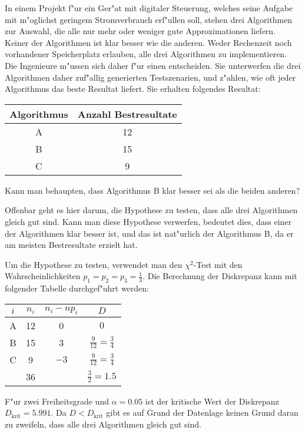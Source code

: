 In einem Projekt f"ur ein Ger"at mit digitaler Steuerung, welches
seine Aufgabe mit m"oglichst geringem Stromverbrauch erf"ullen soll, stehen
drei Algorithmen zur Auswahl, die alle nur mehr oder weniger gute
Approximationen liefern. Keiner der Algorithmen ist klar besser wie
die anderen. Weder Rechenzeit noch vorhandener Speicherplatz
erlauben, alle drei Algorithmen zu implementieren. Die Ingenieure
m"ussen sich daher f"ur einen entscheiden. Sie unterwerfen die drei
Algorithmen daher zuf"allig generierten Testszenarien, und z"ahlen,
wie oft jeder Algorithmus das beste Resultat liefert. Sie erhalten
folgendes Resultat:
\begin{center}
\begin{tabular}{c|c}
Algorithmus&Anzahl Bestresultate\\
\hline
A&12\\
B&15\\
C&9\\
\end{tabular}
\end{center}
Kann man behaupten, dass Algorithmus B klar besser sei als die beiden
anderen?

\begin{loesung}
Offenbar geht es hier darum, die Hypothese zu testen, dass alle
drei Algorithmen gleich gut sind. Kann man diese Hypothese
verwerfen, bedeutet dies, dass einer der Algorithmen klar besser ist,
und das ist nat"urlich der Algorithmus B, da er am meisten Bestresultate
erzielt hat.

Um die Hypothese zu testen, verwendet man den $\chi^2$-Test mit
den Wahrscheinlichkeiten $p_1=p_2=p_3=\frac13$. Die Berechnung
der Diskrepanz kann mit folgender Tabelle durchgef"uhrt werden:
\begin{center}
\begin{tabular}{|c|c|c|c|}
\hline
$i$&$n_i$&$n_i-np_i$&$D$\\
\hline
A&12&0&$0$\\
B&15&3&$\frac{9}{12}=\frac34$\\
C& 9&$-3$&$\frac{9}{12}=\frac34$\\
\hline
&36&&$\frac{3}{2}=1.5$\\
\hline
\end{tabular}
\end{center}
F"ur zwei Freiheitsgrade und $\alpha=0.05$ ist der kritische Wert der
Diskrepanz $D_{\text{krit}}=5.991$. Da $D<D_{\text{krit}}$ gibt es
auf Grund der Datenlage keinen Grund daran zu zweifeln, dass alle drei
Algorithmen gleich gut sind.
\end{loesung}

